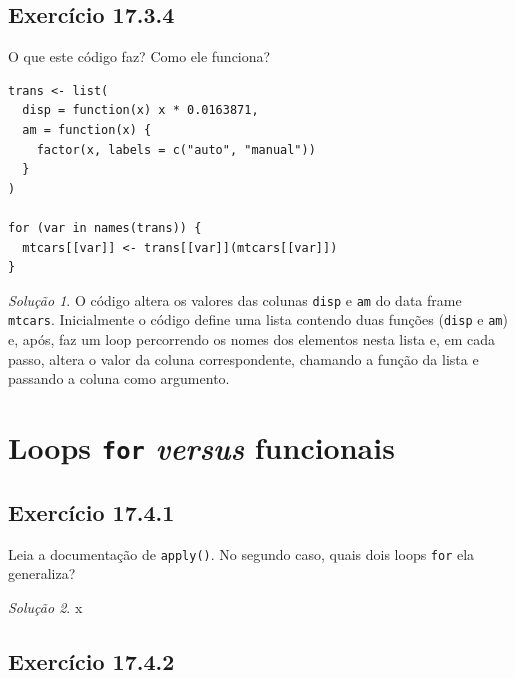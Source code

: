 \documentclass[
]{latex/krantz}
\theoremstyle{definition}
\theoremstyle{definition}
\theoremstyle{definition}
\theoremstyle{definition}
\theoremstyle{remark}
\newtheorem*{solution}{Solução}
\begin{document}
\hypertarget{exr17-3-4}{%
\subsection*{Exercício 17.3.4}\label{exr17-3-4}}

O que este código faz? Como ele funciona?

\begin{verbatim}
trans <- list(
  disp = function(x) x * 0.0163871,
  am = function(x) {
    factor(x, labels = c("auto", "manual"))
  }
)

for (var in names(trans)) {
  mtcars[[var]] <- trans[[var]](mtcars[[var]])
}
\end{verbatim}

\begin{solution}
O código altera os valores das colunas \texttt{disp} e \texttt{am} do data frame \texttt{mtcars}. Inicialmente o código define uma lista contendo duas funções (\texttt{disp} e \texttt{am}) e, após, faz um loop percorrendo os nomes dos elementos nesta lista e, em cada passo, altera o valor da coluna correspondente, chamando a função da lista e passando a coluna como argumento.
\end{solution}

\hypertarget{loops-for-versus-funcionais}{%
\section{\texorpdfstring{Loops \texttt{for} \emph{versus} funcionais}{Loops for versus funcionais}}\label{loops-for-versus-funcionais}}

\hypertarget{exr17-4-1}{%
\subsection*{Exercício 17.4.1}\label{exr17-4-1}}

Leia a documentação de \texttt{apply()}. No segundo caso, quais dois loops \texttt{for} ela generaliza?

\begin{solution}
x
\end{solution}

\hypertarget{exr17-4-2}{%
\subsection*{Exercício 17.4.2}\label{exr17-4-2}}
\end{document}
